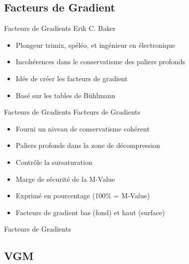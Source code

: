 \subsection{Facteurs de Gradient}

\begin{frame}{Facteurs de Gradients}  
	Erik  C. Baker
	\begin{itemize}
		\item Plongeur trimix, spéléo, et ingénieur en électronique
		\item Incohérences dans le conservatisme des paliers profonds
		\item Idée de créer les facteurs de gradient
		\item Basé sur les tables de Bühlmann
	\end{itemize}
\end{frame}

\begin{frame}{Facteurs de Gradients}  
	Facteurs de Gradients
	\begin{itemize}
		\item Fourni un niveau de conservatisme cohérent
		\item Paliers profonds dans la zone de décompression
		\item Contrôle la sursaturation
		\item Marge de sécurité de la M-Value
		\item Exprimé en pourcentage (100\% = M-Value)
		\item Facteurs de gradient bas (fond) et haut (surface)
	\end{itemize}
\end{frame}

\begin{frame}{Facteurs de Gradients}  
\end{frame}

\subsection{VGM}


